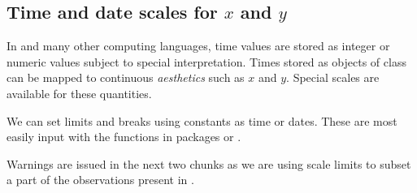 \documentclass[krantz2]{krantz}\usepackage{knitr}
\begin{document}
\subsection{Time and date scales for $x$ and $y$}\label{sec:plot:scales:time:date}
In \Rlang and many other computing languages, time values are stored as integer or numeric values subject to special interpretation. Times stored as objects of class  can be mapped to continuous \emph{aesthetics} such as $x$ and $y$. Special scales are available for these quantities.

We can set limits and breaks using constants as time or dates. These are most easily input with the functions in packages  or .


\begin{warningbox}
Warnings are issued in the next two chunks as we are using scale limits to subset a part of the observations present in .
\end{warningbox}
\end{document}
